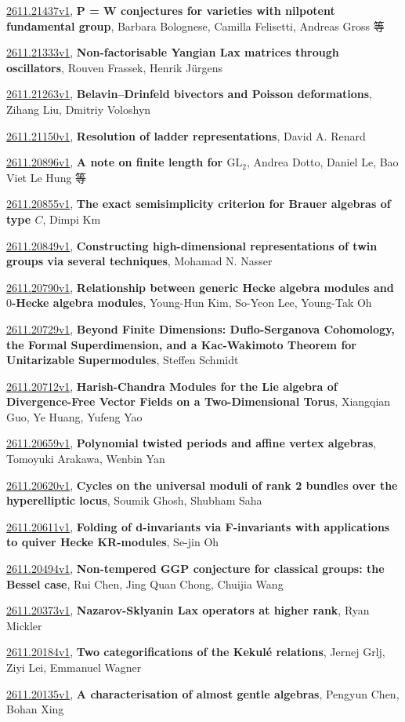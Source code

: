 \documentclass[9pt, a4paper]{article}
\theoremstyle{plain}
\theoremstyle{definition}
\theoremstyle{remark}
\newcommand{\arxiv}[3]{\href{https://arxiv.org/abs/#1}{#1}, \textbf{\textcolor{arxivblue}{#2}}, #3}
\begin{document}
\arxiv{2611.21437v1}{P = W conjectures for varieties with nilpotent fundamental group}{Barbara Bolognese, Camilla Felisetti, Andreas Gross 等}

\arxiv{2611.21333v1}{Non-factorisable Yangian Lax matrices through oscillators}{Rouven Frassek, Henrik Jürgens}

\arxiv{2611.21263v1}{Belavin--Drinfeld bivectors and Poisson deformations}{Zihang Liu, Dmitriy Voloshyn}

\arxiv{2611.21150v1}{Resolution of ladder representations}{David A. Renard}

\arxiv{2611.20896v1}{A note on finite length for $\mathrm{GL}_2$}{Andrea Dotto, Daniel Le, Bao Viet Le Hung 等}

\arxiv{2611.20855v1}{The exact semisimplicity criterion for Brauer algebras of type $C$}{Dimpi Km}

\arxiv{2611.20849v1}{Constructing high-dimensional representations of twin groups via several techniques}{Mohamad N. Nasser}

\arxiv{2611.20790v1}{Relationship between generic Hecke algebra modules and $0$-Hecke algebra modules}{Young-Hun Kim, So-Yeon Lee, Young-Tak Oh}

\arxiv{2611.20729v1}{Beyond Finite Dimensions: Duflo-Serganova Cohomology, the Formal Superdimension, and a Kac-Wakimoto Theorem for Unitarizable Supermodules}{Steffen Schmidt}

\arxiv{2611.20712v1}{Harish-Chandra Modules for the Lie algebra of Divergence-Free Vector Fields on a Two-Dimensional Torus}{Xiangqian Guo, Ye Huang, Yufeng Yao}

\arxiv{2611.20659v1}{Polynomial twisted periods and affine vertex algebras}{Tomoyuki Arakawa, Wenbin Yan}

\arxiv{2611.20620v1}{Cycles on the universal moduli of rank 2 bundles over the hyperelliptic locus}{Soumik Ghosh, Shubham Saha}

\arxiv{2611.20611v1}{Folding of d-invariants via F-invariants with applications to quiver Hecke KR-modules}{Se-jin Oh}

\arxiv{2611.20494v1}{Non-tempered GGP conjecture for classical groups: the Bessel case}{Rui Chen, Jing Quan Chong, Chuijia Wang}

\arxiv{2611.20373v1}{Nazarov-Sklyanin Lax operators at higher rank}{Ryan Mickler}

\arxiv{2611.20184v1}{Two categorifications of the Kekulé relations}{Jernej Grlj, Ziyi Lei, Emmanuel Wagner}

\arxiv{2611.20135v1}{A characterisation of almost gentle algebras}{Pengyun Chen, Bohan Xing}
\end{document}
